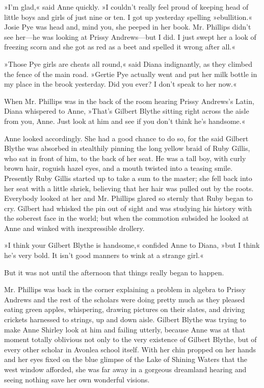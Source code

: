 »I’m glad,« said Anne quickly. »I couldn’t really feel proud of keeping head of little boys and girls of just nine or ten. I got up yesterday spelling »ebullition.« Josie Pye was head and, mind you, she peeped in her book. Mr. Phillips didn’t see her—he was looking at Prissy Andrews—but I did. I just swept her a look of freezing scorn and she got as red as a beet and spelled it wrong after all.«

»Those Pye girls are cheats all round,« said Diana indignantly, as they climbed the fence of the main road. »Gertie Pye actually went and put her milk bottle in my place in the brook yesterday. Did you ever? I don’t speak to her now.«

When Mr. Phillips was in the back of the room hearing Prissy Andrews’s Latin, Diana whispered to Anne, »That’s Gilbert Blythe sitting right across the aisle from you, Anne. Just look at him and see if you don’t think he’s handsome.«

Anne looked accordingly. She had a good chance to do so, for the said Gilbert Blythe was absorbed in stealthily pinning the long yellow braid of Ruby Gillis, who sat in front of him, to the back of her seat. He was a tall boy, with curly brown hair, roguish hazel eyes, and a mouth twisted into a teasing smile. Presently Ruby Gillis started up to take a sum to the master; she fell back into her seat with a little shriek, believing that her hair was pulled out by the roots. Everybody looked at her and Mr. Phillips glared so sternly that Ruby began to cry. Gilbert had whisked the pin out of sight and was studying his history with the soberest face in the world; but when the commotion subsided he looked at Anne and winked with inexpressible drollery.

»I think your Gilbert Blythe is handsome,« confided Anne to Diana, »but I think he’s very bold. It isn’t good manners to wink at a strange girl.«

But it was not until the afternoon that things really began to happen.

Mr. Phillips was back in the corner explaining a problem in algebra to Prissy Andrews and the rest of the scholars were doing pretty much as they pleased eating green apples, whispering, drawing pictures on their slates, and driving crickets harnessed to strings, up and down aisle. Gilbert Blythe was trying to make Anne Shirley look at him and failing utterly, because Anne was at that moment totally oblivious not only to the very existence of Gilbert Blythe, but of every other scholar in Avonlea school itself. With her chin propped on her hands and her eyes fixed on the blue glimpse of the Lake of Shining Waters that the west window afforded, she was far away in a gorgeous dreamland hearing and seeing nothing save her own wonderful visions.

